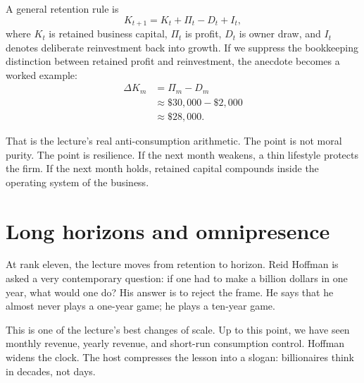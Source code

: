 A general retention rule is
\begin{equation}
K_{t+1} = K_t + \Pi_t - D_t + I_t,
\end{equation}
where \(K_t\) is retained business capital, \(\Pi_t\) is profit, \(D_t\) is owner draw, and \(I_t\) denotes deliberate reinvestment back into growth. If we suppress the bookkeeping distinction between retained profit and reinvestment, the anecdote becomes a worked example:
\begin{align}
\Delta K_m &= \Pi_m - D_m \\
&\approx \$30{,}000 - \$2{,}000 \\
&\approx \$28{,}000.
\end{align}

That is the lecture's real anti-consumption arithmetic. The point is not moral purity. The point is resilience. If the next month weakens, a thin lifestyle protects the firm. If the next month holds, retained capital compounds inside the operating system of the business.

\begin{figure}[h]
\centering
{}
\end{figure}

\section{Long horizons and omnipresence}

At rank eleven, the lecture moves from retention to horizon. Reid Hoffman is asked a very contemporary question: if one had to make a billion dollars in one year, what would one do? His answer is to reject the frame. He says that he almost never plays a one-year game; he plays a ten-year game.

This is one of the lecture's best changes of scale. Up to this point, we have seen monthly revenue, yearly revenue, and short-run consumption control. Hoffman widens the clock. The host compresses the lesson into a slogan: billionaires think in decades, not days.

